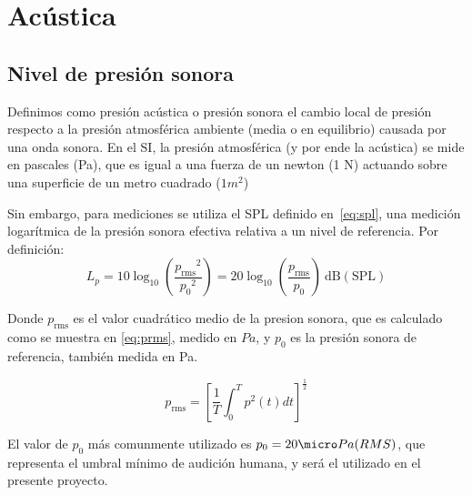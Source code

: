 
%	

\section{Acústica}
\label{sec:RuidoAmb}

\subsection{Nivel de presión sonora}

Definimos como presión acústica o presión sonora el cambio local de presión respecto a la presión atmosférica ambiente (media o en equilibrio) causada por una onda sonora. En el SI, la presión atmosférica (y por ende la acústica) se mide en pascales (Pa), que es igual a una fuerza de un newton (1 N) actuando sobre una superficie de un metro cuadrado ($1 m^2$)

Sin embargo, para mediciones se utiliza el \ac{SPL} definido en~\ref{eq:spl}, una medición logarítmica de la presión sonora efectiva relativa a un nivel de referencia. Por definición:
\begin{equation}
L_p = 10 \log_{10}\left(\frac{{p_\mathrm{rms}}^2}{{p_0}^2}\right) = 20 \log_{10}\left(\frac{p_\mathrm{rms}}{p_0}\right)~\mathrm{dB (SPL)}
\label{eq:spl}
\end{equation}

Donde $p_\mathrm{rms}$ es el valor cuadrático medio de la presion sonora, que es calculado como se muestra en \ref{eq:prms}, medido en $Pa$, y $p_0$ es la presión sonora de referencia, también medida en Pa.

\begin{equation}
p_\mathrm{rms} = \left[ \frac{1}{T} \int_0^T p^2(t)dt \right]^\frac{1}{2}
\label{eq:prms}
\end{equation}

El valor de $p_0$ más comunmente utilizado es $p_0 = 20 \micro Pa (RMS)$, que representa el umbral mínimo de audición humana, y será el utilizado en el presente proyecto.

